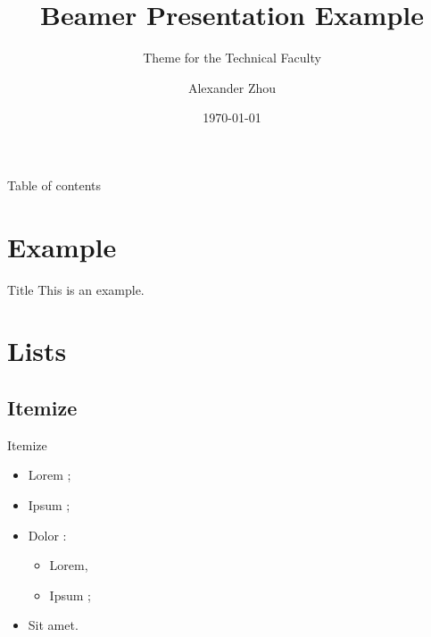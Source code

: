 \documentclass{beamer}
\begin{document}
\title[FAU Beamer Theme]{Beamer Presentation Example}
\subtitle{Theme for the Technical Faculty}
\author{Alexander Zhou}
\date{\today}

\begin{frame}[plain]
  \titlepage
\end{frame}


\begin{frame}{Table of contents}
  \tableofcontents
\end{frame}


\section{Example}
\begin{frame}{Title}
  This is an example.
\end{frame}


\section{Lists}
\subsection{Itemize}

\begin{frame}{Itemize}
  \begin{itemize}
    \item Lorem ;
    \item Ipsum ;
    \item Dolor : 
      \begin{itemize}
        \item Lorem,
        \item Ipsum ;
      \end{itemize}
    \item Sit amet.
  \end{itemize}
\end{frame}
\end{document}
